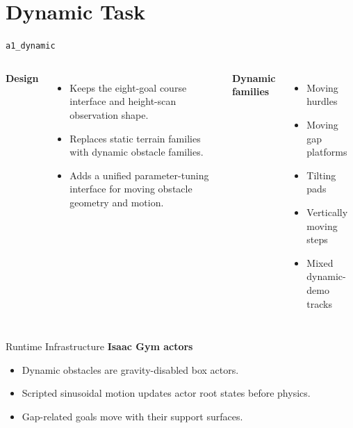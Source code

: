 \documentclass[aspectratio=169,xcolor=dvipsnames]{beamer}
\begin{document}
\section{Dynamic Task}

\begin{frame}{\texttt{a1\_dynamic}}
    \begin{columns}[T,onlytextwidth]
        \textbf{Design}
        \begin{itemize}
            \setlength{\itemsep}{0.35em}
            \item Keeps the eight-goal course interface and height-scan observation shape.
            \item Replaces static terrain families with dynamic obstacle families.
            \item Adds a unified parameter-tuning interface for moving obstacle geometry and motion.
        \end{itemize}

        \textbf{Dynamic families}
        \begin{itemize}
            \setlength{\itemsep}{0.35em}
            \item Moving hurdles
            \item Moving gap platforms
            \item Tilting pads
            \item Vertically moving steps
            \item Mixed dynamic-demo tracks
        \end{itemize}
    \end{columns}
\end{frame}

\begin{frame}{Runtime Infrastructure}
    \textbf{Isaac Gym actors}
    \begin{itemize}
        \setlength{\itemsep}{0.45em}
        \item Dynamic obstacles are gravity-disabled box actors.
        \item Scripted sinusoidal motion updates actor root states before physics.
        \item Gap-related goals move with their support surfaces.
    \end{itemize}
\end{frame}
\end{document}
